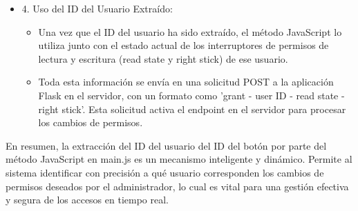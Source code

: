 \documentclass{report}
\begin{document}
\begin{itemize}
    \item 4. Uso del ID del Usuario Extraído:
        \begin{itemize}
            \item Una vez que el ID del usuario ha sido extraído, el método JavaScript lo utiliza junto con el estado actual de los interruptores de permisos de lectura y escritura (read state y right stick) de ese usuario.
            \item Toda esta información se envía en una solicitud POST a la aplicación Flask en el servidor, con un formato como 'grant - user ID - read state - right stick'. Esta solicitud activa el endpoint en el servidor para procesar los cambios de permisos.
        \end{itemize}
\end{itemize}
En resumen, la extracción del ID del usuario del ID del botón por parte del método JavaScript en main.js es un mecanismo inteligente y dinámico. 
Permite al sistema identificar con precisión a qué usuario corresponden los cambios de permisos deseados por el administrador, lo cual es vital 
para una gestión efectiva y segura de los accesos en tiempo real.
\end{document}
